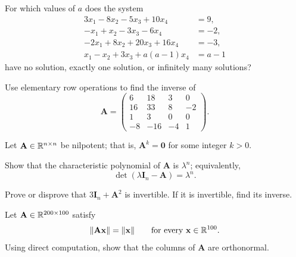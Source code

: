 \documentclass[11pt,oneside]{article}
\begin{document}
\begin{problem}
For which values of $a$ does the system
\[
\begin{aligned}
3x_1-8x_2-5x_3+10x_4&=9,\\
-x_1+x_2-3x_3-6x_4&=-2,\\
-2x_1+8x_2+20x_3+16x_4&=-3,\\
x_1-x_2+3x_3+a(a-1)x_4&=a-1
\end{aligned}
\]
have no solution, exactly one solution, or infinitely many solutions?
\end{problem}

\begin{problem}
Use elementary row operations to find the inverse of
\[
\mathbf A=
\begin{pmatrix}
6&18&3&0\\
16&33&8&-2\\
1&3&0&0\\
-8&-16&-4&1
\end{pmatrix}.
\]
\end{problem}

\begin{problem}
Let $\mathbf A\in\mathbb{R}^{n\times n}$ be nilpotent; that is, $\mathbf A^k=\mathbf0$ for some integer $k>0$.
\begin{problemsubparts}
\item Show that the characteristic polynomial of $\mathbf A$ is $\lambda^n$; equivalently,
\[
\det(\lambda\mathbf I_n-\mathbf A)=\lambda^n.
\]
\item Prove or disprove that $3\mathbf I_n+\mathbf A^2$ is invertible. If it is invertible, find its inverse.
\end{problemsubparts}
\end{problem}

\begin{problem}
Let $\mathbf A\in\mathbb{R}^{200\times100}$ satisfy
\[
\|\mathbf A\mathbf x\|=\|\mathbf x\|
\qquad\text{for every }\mathbf x\in\mathbb{R}^{100}.
\]
Using direct computation, show that the columns of $\mathbf A$ are orthonormal.
\end{problem}
\end{document}
